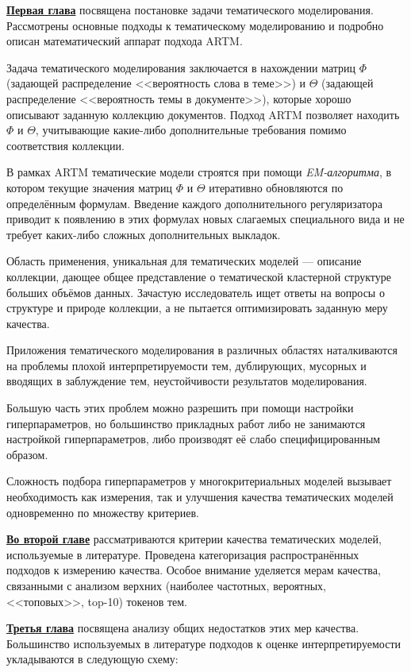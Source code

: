 \underline{\textbf{Первая глава}} посвящена постановке задачи тематического моделирования. Рассмотрены основные подходы к тематическому моделированию и подробно описан математический аппарат подхода ARTM.

Задача тематического моделирования заключается в нахождении матриц $\Phi$ (задающей распределение <<вероятность слова в теме>>) и $\Theta$ (задающей распределение <<вероятность темы в документе>>), которые хорошо описывают заданную коллекцию документов. Подход ARTM позволяет находить $\Phi$ и $\Theta$, учитывающие какие-либо дополнительные требования помимо соответствия коллекции.

В рамках ARTM тематические модели строятся при помощи \textit{EM-алгоритма}, в котором текущие значения матриц $\Phi$ и $\Theta$ итеративно обновляются по определённым формулам. Введение каждого дополнительного регуляризатора приводит к появлению в этих формулах новых слагаемых специального вида и не требует каких-либо сложных дополнительных выкладок.

Область применения, уникальная для тематических моделей --- описание коллекции, дающее общее представление о тематической кластерной структуре больших объёмов данных. Зачастую исследователь ищет ответы на вопросы о структуре и природе коллекции, а не пытается оптимизировать заданную меру качества.

Приложения тематического моделирования в различных областях наталкиваются на проблемы плохой интерпретируемости тем, дублирующих, мусорных и вводящих в заблуждение тем, неустойчивости результатов моделирования. 

Большую часть этих проблем можно разрешить при помощи настройки гиперпараметров, но большинство прикладных работ либо не занимаются настройкой гиперпараметров, либо производят её слабо специфицированным образом.

Сложность подбора гиперпараметров у многокритериальных моделей вызывает необходимость как измерения, так и улучшения качества тематических моделей одновременно по множеству критериев.

\underline{\textbf{Во второй главе}} рассматриваются критерии качества тематических моделей, используемые в литературе. Проведена категоризация распространённых подходов к измерению качества. Особое внимание уделяется мерам качества, связанными с анализом верхних (наиболее частотных, вероятных, <<топовых>>, top-10) токенов тем.

\underline{\textbf{Третья глава}} посвящена анализу общих недостатков этих мер качества. Большинство используемых в литературе подходов к оценке интерпретируемости укладываются в следующую схему:

